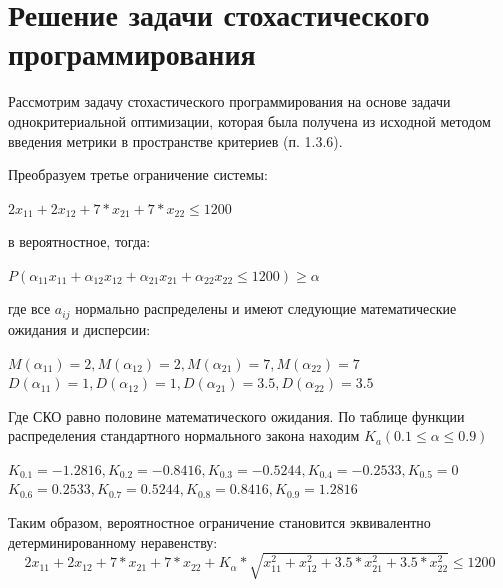 \section{Решение задачи стохастического программирования}
Рассмотрим задачу стохастического программирования на основе задачи однокритериальной оптимизации, которая была получена из исходной методом введения метрики в пространстве критериев (п. 1.3.6).

Преобразуем третье ограничение системы:
\begin{center}
$2x_{11}+2x_{12}+7*x_{21}+7*x_{22} \leq 1200$
\end{center}

 в вероятностное, тогда:
\begin{center}
$P(\alpha_{11}x_{11}+\alpha_{12}x_{12}+\alpha_{21}x_{21}+\alpha_{22}x_{22} \leq 1200)\geq \alpha$
\end{center}
где все $a_{ij}$ нормально распределены и имеют следующие математические ожидания и дисперсии:
\begin{center}
$M(\alpha_{11})=2, M(\alpha_{12})=2, M(\alpha_{21})=7, M(\alpha_{22})=7$
$D(\alpha_{11})=1, D(\alpha_{12})=1, D(\alpha_{21})=3.5, D(\alpha_{22})=3.5$
\end{center}
Где СКО равно половине математического ожидания. По таблице функции распределения стандартного нормального закона  находим $K_a (0.1\leq \alpha\leq 0.9)$
\begin{center}
$K_{0.1}=-1.2816, K_{0.2}=-0.8416, K_{0.3}=-0.5244, K_{0.4}=-0.2533, K_{0.5}=0$
$K_{0.6}=0.2533, K_{0.7}=0.5244, K_{0.8}=0.8416, K_{0.9}=1.2816$
\end{center}
Таким образом, вероятностное ограничение становится эквивалентно детерминированному неравенству:	
\begin{equation}
2x_{11}+2x_{12}+7*x_{21}+7*x_{22}+K_{\alpha}*\sqrt{x_{11}^2+x_{12}^2+3.5*x_{21}^2+3.5*x_{22}^2} \leq 1200
\end{equation}



